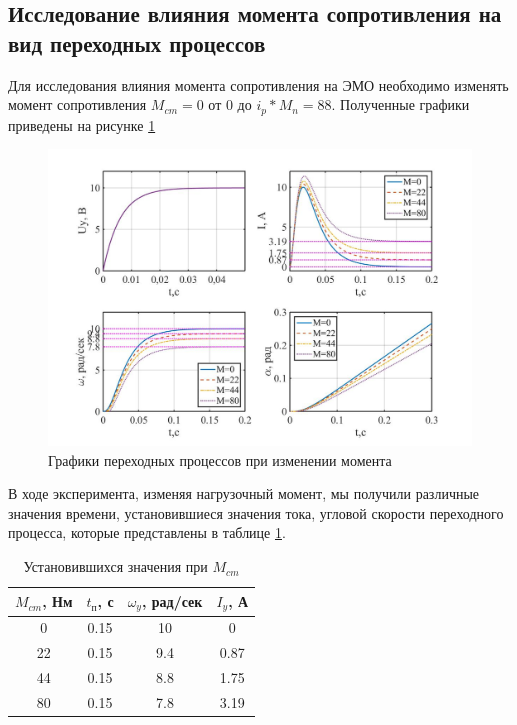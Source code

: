 \documentclass[a4paper, 12pt]{article}
\begin{document}
\newpage
\begin{center}
\section{Исследование влияния момента сопротивления на вид переходных процессов}
\end{center}\par
Для исследования влияния момента сопротивления на ЭМО необходимо изменять момент сопротивления $M_{cm}=0$ от 0 до $i_p*M_n=88$. Полученные графики приведены на рисунке \ref{moment}

\begin{figure}[h!]
	\centering
	\includegraphics[width = 1\textwidth]{data/moment}
	\caption{Графики переходных процессов при изменении момента}
	\label{moment}
\end{figure}  
В ходе эксперимента, изменяя нагрузочный момент, мы получили различные значения времени, установившиеся значения тока, угловой скорости переходного процесса, которые представлены в таблице \ref{tab:moment}.

\begin{table}[h!]
	\centering
	\begin{threeparttable}
		\caption{Установившихся значения при $M_{cm}$}
		\begin{tabular}{|c|c|c|c|}
			\hline
			$M_{cm}$, Нм	&	$t_\text{п}$, с	&	$\omega_y$, рад/сек	&	$I_y$, А\\
			\hline
			0		&	0.15			&	10			&	0\\
			\hline
			22		&	0.15			&	9.4			&	0.87\\
			\hline
			44		&	0.15			&	8.8			&	1.75\\
			\hline
			80		&	0.15			&	7.8			&	3.19\\
			\hline
			
		\end{tabular}
		\label{tab:moment}
	\end{threeparttable}
\end{table}
\end{document}

